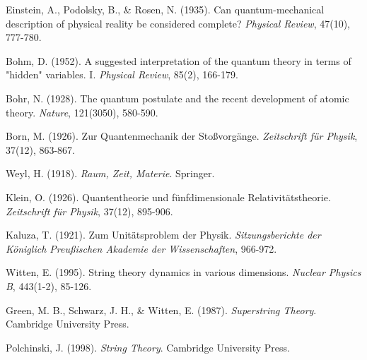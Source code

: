 \documentclass[12pt,a4paper]{article}
\begin{document}
\begin{thebibliography}{99}
Einstein, A., Podolsky, B., \& Rosen, N. (1935). Can quantum-mechanical description of physical reality be considered complete? \textit{Physical Review}, 47(10), 777-780.

Bohm, D. (1952). A suggested interpretation of the quantum theory in terms of "hidden" variables. I. \textit{Physical Review}, 85(2), 166-179.

Bohr, N. (1928). The quantum postulate and the recent development of atomic theory. \textit{Nature}, 121(3050), 580-590.

Born, M. (1926). Zur Quantenmechanik der Stoßvorgänge. \textit{Zeitschrift für Physik}, 37(12), 863-867.

Weyl, H. (1918). \textit{Raum, Zeit, Materie}. Springer.

Klein, O. (1926). Quantentheorie und fünfdimensionale Relativitätstheorie. \textit{Zeitschrift für Physik}, 37(12), 895-906.

Kaluza, T. (1921). Zum Unitätsproblem der Physik. \textit{Sitzungsberichte der Königlich Preußischen Akademie der Wissenschaften}, 966-972.

Witten, E. (1995). String theory dynamics in various dimensions. \textit{Nuclear Physics B}, 443(1-2), 85-126.

Green, M. B., Schwarz, J. H., \& Witten, E. (1987). \textit{Superstring Theory}. Cambridge University Press.

Polchinski, J. (1998). \textit{String Theory}. Cambridge University Press.

\end{thebibliography}
\end{document}
